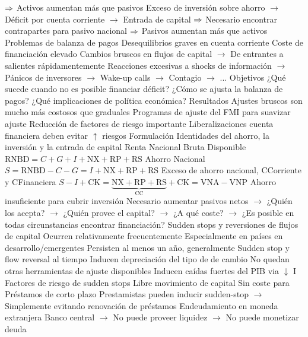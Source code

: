 \documentclass{nuevotema}
\begin{document}
\begin{esquemal}
				\4[] $\Rightarrow$ Activos aumentan más que pasivos
				\4[] Exceso de inversión sobre ahorro
				\4[] $\to$ Déficit por cuenta corriente
				\4[] $\to$ Entrada de capital
				\4[] $\Rightarrow$ Necesario encontrar contrapartes para pasivo nacional
				\4[] $\Rightarrow$ Pasivos aumentan más que activos
				\4 Problemas de balanza de pagos
				\4[] Desequilibrios graves en cuenta corriente
				\4[] Coste de financiación elevado
				\4[] Cambios bruscos en flujos de capital
				\4[] $\to$ De entrantes a salientes rápidamentemente
				\4[] Reacciones excesivas a shocks de información
				\4[] $\to$ Pánicos de inversores
				\4[] $\to$ Wake-up calls
				\4[] $\to$ Contagio
				\4[] $\to$ ...
			\3 Objetivos
				\4 ¿Qué sucede cuando no es posible financiar déficit?
				\4 ¿Cómo se ajusta la balanza de pagos?
				\4 ¿Qué implicaciones de política económica?
			\3 Resultados
				\4 Ajustes bruscos son mucho más costosos que graduales
				\4 Programas de ajuste del FMI para suavizar ajuste
				\4 Reducción de factores de riesgo importante
				\4 Liberalizaciones cuenta financiera deben evitar $\uparrow$ riesgos
		\2 Formulación
			\3 Identidades del ahorro, la inversión y la entrada de capital
				\4 Renta Nacional Bruta Disponible
				\4[] $\text{RNBD} = C+G+I+\text{NX}+ \text{RP}+\text{RS}$
				\4 Ahorro Nacional
				\4[] $S= \text{RNBD} - C -G = I + \text{NX} + \text{RP}+ \text{RS}$
				\4 Exceso de ahorro nacional, CCorriente y CFinanciera
				\4[] $S-I+\text{CK} = \underbrace{\text{NX}+\text{RP} + \text{RS}}_{\text{CC}} +\text{CK} = \text{VNA} - \text{VNP}$
				\4 Ahorro insuficiente para cubrir inversión
				\4[] Necesario aumentar pasivos netos
				\4[] $\to$ ¿Quién los acepta?
				\4[] $\to$ ¿Quién provee el capital?
				\4[] $\to$ ¿A qué coste?
				\4[] $\to$ ¿Es posible en todas circunstancias encontrar financiación?
			\3 Sudden stops y reversiones de flujos de capital
				\4 Ocurren relativamente frecuentemente
				\4 Especialmente en países en desarrollo/emergentes
				\4 Persisten al menos un año, generalmente
				\4 Sudden stop y flow reversal al tiempo
				\4 Inducen depreciación del tipo de de cambio
				\4[] No quedan otras herramientas de ajuste disponibles
				\4 Inducen caídas fuertes del PIB via $\downarrow$ I
			\3 Factores de riesgo de sudden stops
				\4 Libre movimiento de capital
				\4[] Sin coste para
				\4 Préstamos de corto plazo
				\4[] Prestamistas pueden inducir sudden-stop
				\4[] $\to$ Simplemente evitando renovación de préstamos
				\4 Endeudamiento en moneda extranjera
				\4[] Banco central
				\4[] $\to$ No puede proveer liquidez
				\4[] $\to$ No puede monetizar deuda

\end{esquemal}
\end{document}
